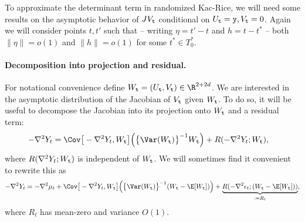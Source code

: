 \documentclass{article}
\begin{document}
	To approximate the determinant term in randomized Kac-Rice, we will need some results on the asymptotic behavior of $JV_{{\tt t}}$ conditional on $U_{{\tt t}} = {\tt y}, V_{{\tt t}} = 0$. Again we will consider points $t,  t'$ such that -- writing $\eta = t' - t$ and $h = t - t^*$ -- both $\|\eta\| = o(1)$ and $\|h\| = o(1)$ for some $t^* \in T_0^*$. 
	
	\paragraph{Decomposition into projection and residual.}
	For notational convenience define $W_{{\tt t}} = (U_{{\tt t}}, V_{{\tt t}}) \in \R^{2 + 2d}$. We are interested in the asymptotic distribution of the Jacobian of $V_{\tt t}$ given $W_{{\tt t}}$. To do so, it will be useful to decompose the Jacobian into its projection onto $W_{{\tt t}}$ and a residual term:
	\begin{equation}
		\begin{aligned}
			-\nabla^2 Y_t 
			& = 
			\Cov\big[-\nabla^2 Y_t, W_{{\tt t}}\big]\Big(\big\{\Var(W_{{\tt t}})\big\}^{-1} W_{{\tt t}}\Big) + R(-\nabla^2 Y_t; W_{{\tt t}}),
		\end{aligned}
	\end{equation}
	where $R(\nabla^2 Y_t; W_{{\tt t}})$ is independent of $W_{{\tt t}}$. We will sometimes find it convenient to rewrite this as
	\begin{equation}
		\label{eqn:hessian-decomposition}
		-\nabla^2 Y_t = -\nabla^2 \mu_t +	\Cov\big[-\nabla^2 Y_t, W_{{\tt t}}\big]\Big(\big\{\Var(W_{{\tt t}})\big\}^{-1} (W_{{\tt t}} - \E[W_{{\tt t}}])\Big) + \underbrace{R(-\nabla^2 \epsilon_t; (W_{{\tt t}} - \E[W_{{\tt t}}]))}_{:= R_t},
	\end{equation}
	where $R_t$ has mean-zero and variance $O(1)$.
	
\end{document}
